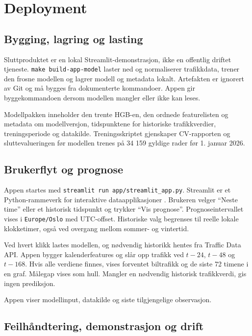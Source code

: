 \section{Deployment}

\subsection{Bygging, lagring og lasting}

Sluttproduktet er en lokal Streamlit-demonstrasjon, ikke en offentlig driftet
tjeneste. \texttt{make build-app-model} laster ned og normaliserer trafikkdata,
trener den frosne modellen og lagrer modell og metadata lokalt. Artefakten er
ignorert av Git og må bygges fra dokumenterte kommandoer. Appen gir byggekommandoen
dersom modellen mangler eller ikke kan leses.

Modellpakken inneholder den trente HGB-en, den ordnede featurelisten og metadata om
modellversjon, tidspunktene for historiske trafikkverdier, treningsperiode og
datakilde. Treningsskriptet gjenskaper
CV-rapporten og sluttevalueringen før modellen trenes på 34 159 gyldige rader før
1. januar 2026.

\subsection{Brukerflyt og prognose}

Appen startes med \texttt{streamlit run app/streamlit\_app.py}. Streamlit er et
Python-rammeverk for interaktive dataapplikasjoner \cite{streamlit-docs}. Brukeren
velger \enquote{Neste time} eller et historisk tidspunkt og trykker
\enquote{Vis prognose}. Prognoseintervallet vises i \texttt{Europe/Oslo} med
UTC-offset. Historiske valg begrenses til reelle lokale klokketimer, også ved
overgang mellom sommer- og vintertid.

Ved hvert klikk lastes modellen, og nødvendig historikk hentes fra Traffic Data API.
Appen bygger kalenderfeatures og slår opp trafikk ved $t-24$, $t-48$ og $t-168$.
Hvis alle verdiene finnes, vises forventet biltrafikk og de siste 72 timene i en
graf. Målegap vises som hull. Mangler en nødvendig historisk trafikkverdi, gis
ingen prediksjon.

Appen viser modellinput, datakilde og siste tilgjengelige observasjon.

\subsection{Feilhåndtering, demonstrasjon og drift}


